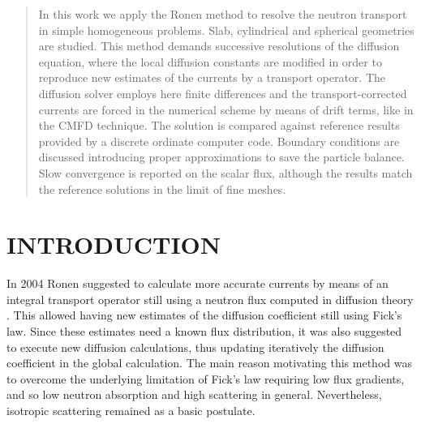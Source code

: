 \documentclass{ictt26}
\begin{document}
\begin{abstract}
In this work we apply the Ronen method to resolve the neutron transport in simple homogeneous problems. Slab, cylindrical and spherical geometries are studied. This method demands successive resolutions of the diffusion equation, where the local diffusion constants are modified in order to reproduce new estimates of the currents by a transport operator. The diffusion solver employs here finite differences and the transport-corrected currents are forced in the numerical scheme by means of drift terms, like in the CMFD technique. The solution is compared against reference results provided by a discrete ordinate computer code. Boundary conditions are discussed introducing proper approximations to save the particle balance. Slow convergence is reported on the scalar flux, although the results match the reference solutions in the limit of fine meshes.
%
\end{abstract}
%
%
\raggedright

\section{INTRODUCTION}
\label{sec:intro}

In 2004 Ronen suggested to calculate more accurate currents by means of an integral transport operator still using a neutron flux computed in diffusion theory \cite{ronen2004accurate}. This allowed having new estimates of the diffusion coefficient still using Fick's law. Since these estimates need a known flux distribution, it was also suggested to execute new diffusion calculations, thus updating iteratively the diffusion coefficient in the global calculation. The main reason motivating this method was to overcome the underlying limitation of Fick's law requiring low flux gradients, and so low neutron absorption and high scattering in general. Nevertheless, isotropic scattering remained as a basic postulate.
\end{document}
